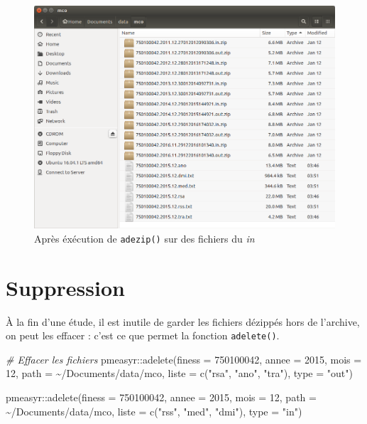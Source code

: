 \documentclass[
]{book}
\newenvironment{Shaded}{\begin{snugshade}}{\end{snugshade}}
\newcommand{\AttributeTok}[1]{\textcolor[rgb]{0.77,0.63,0.00}{#1}}
\newcommand{\CommentTok}[1]{\textcolor[rgb]{0.56,0.35,0.01}{\textit{#1}}}
\newcommand{\DecValTok}[1]{\textcolor[rgb]{0.00,0.00,0.81}{#1}}
\newcommand{\FunctionTok}[1]{\textcolor[rgb]{0.00,0.00,0.00}{#1}}
\newcommand{\NormalTok}[1]{#1}
\newcommand{\SpecialCharTok}[1]{\textcolor[rgb]{0.00,0.00,0.00}{#1}}
\newcommand{\StringTok}[1]{\textcolor[rgb]{0.31,0.60,0.02}{#1}}
\begin{document}
\begin{figure}
\centering
\includegraphics{images/archives_mco_in.png}
\caption{Après éxécution de \texttt{adezip()} sur des fichiers du \emph{in}}
\end{figure}

\hypertarget{suppression}{%
\section{Suppression}\label{suppression}}

À la fin d'une étude, il est inutile de garder les fichiers dézippés hors de l'archive, on peut les effacer : c'est ce que permet la fonction \texttt{adelete()}.

\begin{Shaded}
\begin{Highlighting}[]
\CommentTok{\# Effacer les fichiers}
\NormalTok{pmeasyr}\SpecialCharTok{::}\FunctionTok{adelete}\NormalTok{(}\AttributeTok{finess =} \DecValTok{750100042}\NormalTok{, }
                 \AttributeTok{annee =} \DecValTok{2015}\NormalTok{, }
                 \AttributeTok{mois =} \DecValTok{12}\NormalTok{, }
                 \AttributeTok{path =} \StringTok{\textquotesingle{}\textasciitilde{}/Documents/data/mco\textquotesingle{}}\NormalTok{, }
                 \AttributeTok{liste =} \FunctionTok{c}\NormalTok{(}\StringTok{"rsa"}\NormalTok{, }\StringTok{"ano"}\NormalTok{, }\StringTok{"tra"}\NormalTok{), }
                 \AttributeTok{type =} \StringTok{"out"}\NormalTok{)}

\NormalTok{pmeasyr}\SpecialCharTok{::}\FunctionTok{adelete}\NormalTok{(}\AttributeTok{finess =} \DecValTok{750100042}\NormalTok{, }
                 \AttributeTok{annee =} \DecValTok{2015}\NormalTok{, }
                 \AttributeTok{mois =} \DecValTok{12}\NormalTok{, }
                 \AttributeTok{path =} \StringTok{\textquotesingle{}\textasciitilde{}/Documents/data/mco\textquotesingle{}}\NormalTok{, }
                 \AttributeTok{liste =} \FunctionTok{c}\NormalTok{(}\StringTok{"rss"}\NormalTok{, }\StringTok{"med"}\NormalTok{, }\StringTok{"dmi"}\NormalTok{), }
                 \AttributeTok{type =} \StringTok{"in"}\NormalTok{)}
\end{Highlighting}
\end{Shaded}
\end{document}
